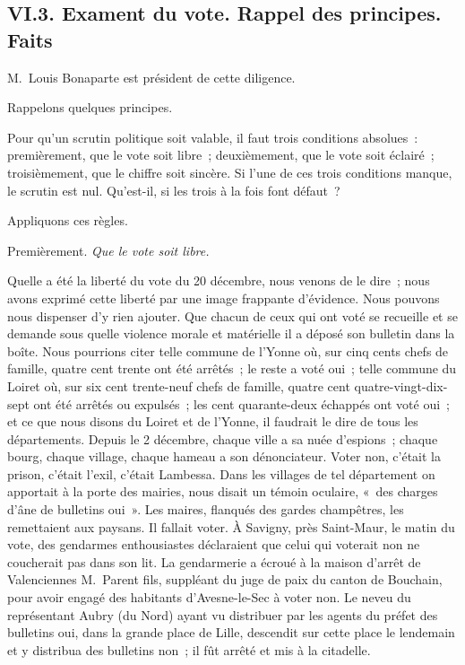 \documentclass[french,twoside]{book} %
\begin{document}
\subsection[{VI.3. Exament du vote. Rappel des principes. Faits}]{VI.3. Exament du vote. Rappel des principes. Faits}
\noindent M. Louis Bonaparte est président de cette diligence.\par
Rappelons quelques principes.\par
Pour qu’un scrutin politique soit valable, il faut trois conditions absolues : premièrement, que le vote soit libre ; deuxièmement, que le vote soit éclairé ; troisièmement, que le chiffre soit sincère. Si l’une de ces trois conditions manque, le scrutin est nul. Qu’est-il, si les trois à la fois font défaut ?\par
Appliquons ces règles.\par
Premièrement. \emph{Que le vote soit libre.}\par
Quelle a été la liberté du vote du 20 décembre, nous venons de le dire ; nous avons exprimé cette liberté par une image frappante d’évidence. Nous pouvons nous dispenser d’y rien ajouter. Que chacun de ceux qui ont voté se recueille et se demande sous quelle violence morale et matérielle il a déposé son bulletin dans la boîte. Nous pourrions citer telle commune de l’Yonne où, sur cinq cents chefs de famille, quatre cent trente ont été arrêtés ; le reste a voté oui ; telle commune du Loiret où, sur six cent trente-neuf chefs de famille, quatre cent quatre-vingt-dix-sept ont été arrêtés ou expulsés ; les cent quarante-deux échappés ont voté oui ; et ce que nous disons du Loiret et de l’Yonne, il faudrait le dire de tous les départements. Depuis le 2 décembre, chaque ville a sa nuée d’espions ; chaque bourg, chaque village, chaque hameau a son dénonciateur. Voter non, c’était la prison, c’était l’exil, c’était Lambessa. Dans les villages de tel département on apportait à la porte des mairies, nous disait un témoin oculaire, « des charges d’âne de bulletins oui ». Les maires, flanqués des gardes champêtres, les remettaient aux paysans. Il fallait voter. À Savigny, près Saint-Maur, le matin du vote, des gendarmes enthousiastes déclaraient que celui qui voterait non ne coucherait pas dans son lit. La gendarmerie a écroué à la maison d’arrêt de Valenciennes M. Parent fils, suppléant du juge de paix du canton de Bouchain, pour avoir engagé des habitants d’Avesne-le-Sec à voter non. Le neveu du représentant Aubry (du Nord) ayant vu distribuer par les agents du préfet des bulletins oui, dans la grande place de Lille, descendit sur cette place le lendemain et y distribua des bulletins non ; il fût arrêté et mis à la citadelle.\par
\end{document}
